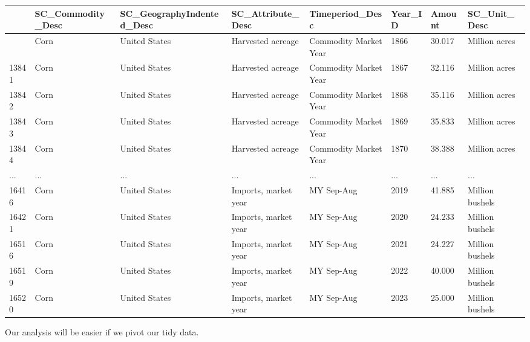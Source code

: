 \documentclass[
  letterpaper,
  DIV=11,
  numbers=noendperiod]{scrreprt}
\begin{document}
\begin{longtable}[]{@{}llllllll@{}}
\toprule\noalign{}
& SC\_Commodity\_Desc & SC\_GeographyIndented\_Desc &
SC\_Attribute\_Desc & Timeperiod\_Desc & Year\_ID & Amount &
SC\_Unit\_Desc \\
\midrule\noalign{}
\endhead
\bottomrule\noalign{}
\endlastfoot
13840 & Corn & United States & Harvested acreage & Commodity Market Year
& 1866 & 30.017 & Million acres \\
13841 & Corn & United States & Harvested acreage & Commodity Market Year
& 1867 & 32.116 & Million acres \\
13842 & Corn & United States & Harvested acreage & Commodity Market Year
& 1868 & 35.116 & Million acres \\
13843 & Corn & United States & Harvested acreage & Commodity Market Year
& 1869 & 35.833 & Million acres \\
13844 & Corn & United States & Harvested acreage & Commodity Market Year
& 1870 & 38.388 & Million acres \\
... & ... & ... & ... & ... & ... & ... & ... \\
16416 & Corn & United States & Imports, market year & MY Sep-Aug & 2019
& 41.885 & Million bushels \\
16421 & Corn & United States & Imports, market year & MY Sep-Aug & 2020
& 24.233 & Million bushels \\
16516 & Corn & United States & Imports, market year & MY Sep-Aug & 2021
& 24.227 & Million bushels \\
16519 & Corn & United States & Imports, market year & MY Sep-Aug & 2022
& 40.000 & Million bushels \\
16520 & Corn & United States & Imports, market year & MY Sep-Aug & 2023
& 25.000 & Million bushels \\
\end{longtable}

Our analysis will be easier if we pivot our tidy data.
\end{document}
